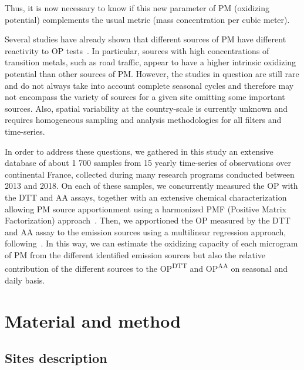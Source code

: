 \documentclass[acp]{copernicus}
\begin{document}
Thus, it is now necessary to know if this new parameter of PM (oxidizing
potential) complements the usual metric (mass concentration per cubic
meter).

Several studies have already shown that different sources of PM have
different reactivity to OP
tests~\citep{batesReactive2015,cesariSource2019,fangOxidative2016,paraskevopoulouYearlong2019,vermaReactive2014,weberApportionment2018,zhouPredominance2019}. In particular, sources
with high concentrations of transition metals, such as road traffic,
appear to have a higher intrinsic oxidizing potential than other sources
of PM. However, the studies in question are still rare and do not always
take into account complete seasonal cycles and therefore may not
encompass the variety of sources for a given site omitting some
important sources. Also, spatial variability at the country-scale is
currently unknown and requires homogeneous sampling and analysis
methodologies for all filters and time-series.

In order to address these questions, we gathered in this study an
extensive database of about 1 700 samples from 15 yearly time-series of
observations over continental France, collected during many research
programs conducted between 2013 and 2018. On each of these samples, we
concurrently measured the OP with the DTT and AA assays, together with
an extensive chemical characterization allowing PM source apportionment
using a harmonized PMF (Positive Matrix Factorization)
approach~\citep{weberComparison2019}. Then, we apportioned the OP measured by the DTT and AA
assay to the emission sources using a multilinear regression approach,
following~\citet{weberApportionment2018}. In this way, we can estimate the
oxidizing capacity of each microgram of PM from the different identified
emission sources but also the relative contribution of the different
sources to the OP\textsuperscript{DTT} and OP\textsuperscript{AA} on
seasonal and daily basis.

\section{Material and method}%
\label{material_and_method}

\subsection{Sites description}%
\label{sites_description}
\end{document}
